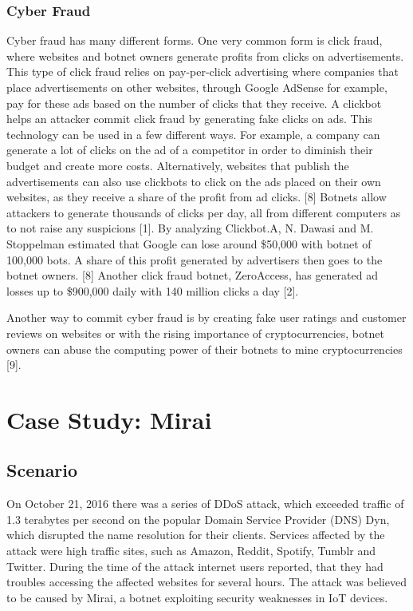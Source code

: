 		\subsubsection{Cyber Fraud}
		Cyber fraud has many different forms. One very common form is click fraud, where websites and botnet owners generate profits from clicks on advertisements. This type of click fraud relies on pay-per-click advertising where companies that place advertisements on other websites, through Google AdSense for example, pay for these ads based on the number of clicks that they receive. A clickbot helps an attacker commit click fraud by generating fake clicks on ads. This technology can be used in a few different ways. For example, a company can generate a lot of clicks on the ad of a competitor in order to diminish their budget and create more costs. Alternatively, websites that publish the advertisements can also use clickbots to click on the ads placed on their own websites, as they receive a share of the profit from ad clicks. [8] Botnets allow attackers to generate thousands of clicks per day, all from different computers as to not raise any suspicions [1]. By analyzing Clickbot.A, N. Dawasi and M. Stoppelman estimated that Google can lose around \$50,000 with botnet of 100,000 bots. A share of this profit generated by advertisers then goes to the botnet owners. [8] Another click fraud botnet, ZeroAccess, has generated ad losses up to \$900,000 daily with 140 million clicks a day [2].

Another way to commit cyber fraud is by creating fake user ratings and customer reviews on websites or with the rising importance of cryptocurrencies, botnet owners can abuse the computing power of their botnets to mine cryptocurrencies [9].
		
\section{Case Study: Mirai}
	\subsection{Scenario}
	On October 21, 2016 there was a series of DDoS attack, which exceeded traffic of 1.3 terabytes per second on the popular Domain Service Provider (DNS) Dyn, which disrupted the name resolution for their clients. Services affected by the attack were high traffic sites, such as Amazon, Reddit, Spotify, Tumblr and Twitter. During the time of the attack internet users reported, that they had troubles accessing the affected websites for several hours. The attack was believed to be caused by Mirai, a botnet exploiting security weaknesses in IoT devices.
	

